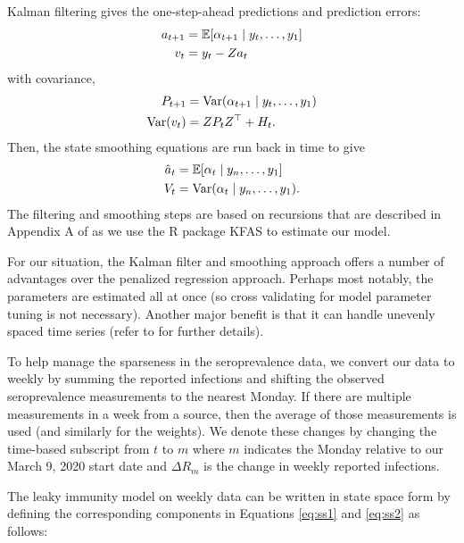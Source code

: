\documentclass{article}
\begin{document}
Kalman filtering gives the one-step-ahead predictions and prediction errors:
\begin{align*}
a_{t+1} &= \mathbb{E}[\alpha_{t+1}\mid y_t, \dots, y_1] \\
v_t &= y_t - Za_t
\end{align*} with covariance, 
\begin{align*}
P_{t+1} &= \operatorname{Var}(\alpha_{t+1} \mid y_t, \dots, y_1) \\
\operatorname{Var}(v_t) &= ZP_tZ^\top + H_t.
\end{align*}
Then, the state smoothing equations are run back in time to give
\begin{align}
\hat{a}_t &= \mathbb{E}[\alpha_{t}\mid y_n, \dots, y_1] \label{eq:hatat}\\
V_t &= \operatorname{Var}(\alpha_{t}\mid y_n, \dots, y_1). \label{eq:Vt}
\end{align}
The filtering and smoothing steps are based on recursions that are described in
Appendix A of \citet{helske2017kfas} as we use the R package KFAS to estimate
our model.

For our situation, the Kalman filter and smoothing approach offers a number of
advantages over the penalized regression approach. Perhaps most notably,
 the parameters are estimated all at once (so cross validating for model
parameter tuning is not necessary). Another major benefit is that it can handle 
unevenly spaced time series (refer to \citealp{durbin2012time} for further details).

To help manage the sparseness in the seroprevalence data, we convert our data 
to weekly by summing the reported infections and shifting the observed 
seroprevalence measurements to the nearest Monday. If there are multiple 
measurements in a week from a source, then the average of those 
measurements is used (and similarly for the weights). We denote these changes by 
changing the time-based subscript from $t$ to $m$ where $m$ indicates the Monday 
relative to our March 9, 2020 start date and $\Delta R_m$ is the change in weekly 
reported infections.

The leaky immunity model on weekly data can be written in state space form by 
defining the corresponding components in Equations \ref{eq:ss1} and 
\ref{eq:ss2} as follows:

\end{document}
